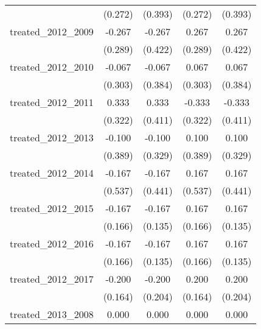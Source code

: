 {\begin{tabular}{l*{4}{c}}
            &     (0.272)         &     (0.393)         &     (0.272)         &     (0.393)         \\
[1em]
treated\_2012\_2009&      -0.267         &      -0.267         &       0.267         &       0.267         \\
            &     (0.289)         &     (0.422)         &     (0.289)         &     (0.422)         \\
[1em]
treated\_2012\_2010&      -0.067         &      -0.067         &       0.067         &       0.067         \\
            &     (0.303)         &     (0.384)         &     (0.303)         &     (0.384)         \\
[1em]
treated\_2012\_2011&       0.333         &       0.333         &      -0.333         &      -0.333         \\
            &     (0.322)         &     (0.411)         &     (0.322)         &     (0.411)         \\
[1em]
treated\_2012\_2013&      -0.100         &      -0.100         &       0.100         &       0.100         \\
            &     (0.389)         &     (0.329)         &     (0.389)         &     (0.329)         \\
[1em]
treated\_2012\_2014&      -0.167         &      -0.167         &       0.167         &       0.167         \\
            &     (0.537)         &     (0.441)         &     (0.537)         &     (0.441)         \\
[1em]
treated\_2012\_2015&      -0.167         &      -0.167         &       0.167         &       0.167         \\
            &     (0.166)         &     (0.135)         &     (0.166)         &     (0.135)         \\
[1em]
treated\_2012\_2016&      -0.167         &      -0.167         &       0.167         &       0.167         \\
            &     (0.166)         &     (0.135)         &     (0.166)         &     (0.135)         \\
[1em]
treated\_2012\_2017&      -0.200         &      -0.200         &       0.200         &       0.200         \\
            &     (0.164)         &     (0.204)         &     (0.164)         &     (0.204)         \\
[1em]
treated\_2013\_2008&       0.000         &       0.000         &       0.000         &       0.000         \\

\end{tabular}}
